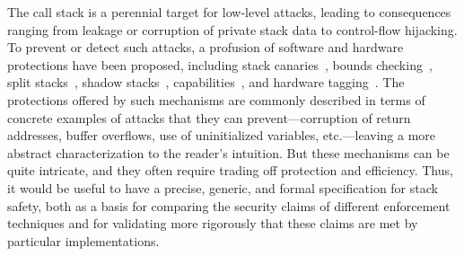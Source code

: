 \documentclass[acmsmall,review,anonymous]{acmart}\settopmatter{printfolios=true,printccs=false,printacmref=false}
\begin{document}
The call stack is a perennial target for low-level attacks, leading to
consequences ranging from leakage or corruption of private stack data to
control-flow hijacking. To prevent or detect such attacks, a profusion of
software and hardware protections have been proposed,
%
including stack canaries~\citep{Cowan+98},
bounds checking~\citep{NagarakatteZMZ09,NagarakatteZMZ10,DeviettiBMZ08},
split stacks~\citep{Kuznetsov+14},
shadow stacks~\citep{Dang+15,Shanbhogue+19},
capabilities~\citep{Woodruff+14,Chisnall+15,SkorstengaardLocal,SkorstengaardSTK,Georges+21},
and hardware tagging~\citep{DBLP:conf/sp/RoesslerD18}. \ifaftersubmission{}
\fi
%
The protections offered by such mechanisms are commonly described in terms
of concrete examples of attacks that they can prevent---corruption
of return addresses, buffer overflows, use of uninitialized variables,
etc.---leaving a more abstract characterization to the reader's intuition.
But these mechanisms can be quite intricate,
and they often require trading off protection and efficiency.
Thus, it would be useful to have a precise, generic, and formal
specification for stack
safety, both as a basis for comparing the security claims of different
enforcement techniques and for validating more rigorously that these claims
are met by particular implementations.
\end{document}

